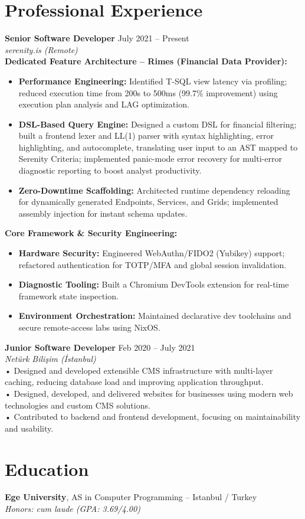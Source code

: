 \documentclass[11pt, a4paper]{article}
\begin{document}
\section*{Professional Experience}
\noindent
\textbf{Senior Software Developer} \hfill July 2021 -- Present \\
\textit{serenity.is (Remote)} \\[4pt]
    \noindent \textbf{Dedicated Feature Architecture – Rimes (Financial Data Provider):}
    \begin{itemize}[nosep]
        \item \textbf{Performance Engineering:} Identified T-SQL view latency via profiling; reduced execution time from 200s to 500ms (99.7\% improvement) using execution plan analysis and LAG optimization.
        \item \textbf{DSL-Based Query Engine:} Designed a custom DSL for financial filtering; built a frontend lexer and LL(1) parser with syntax highlighting, error highlighting, and autocomplete, translating user input to an AST mapped to Serenity Criteria; implemented panic-mode error recovery for multi-error diagnostic reporting to boost analyst productivity.
        \item \textbf{Zero-Downtime Scaffolding:} Architected runtime dependency reloading for dynamically generated Endpoints, Services, and Grids; implemented assembly injection for instant schema updates.
    \end{itemize}
    \noindent \textbf{Core Framework \& Security Engineering:}
    \begin{itemize}[nosep]
        \item \textbf{Hardware Security:} Engineered WebAuthn/FIDO2 (Yubikey) support; refactored authentication for TOTP/MFA and global session invalidation.
        \item \textbf{Diagnostic Tooling:} Built a Chromium DevTools extension for real-time framework state inspection.
        \item \textbf{Environment Orchestration:} Maintained declarative dev toolchains and secure remote-access labs using NixOS.
    \end{itemize}
\vspace{6pt}
\noindent \textbf{Junior Software Developer} \hfill Feb 2020 -- July 2021 \\
\textit{Netürk Bilişim (İstanbul)} \\[4pt]
• Designed and developed extensible CMS infrastructure with multi-layer caching, reducing database load and improving application throughput.\\
• Designed, developed, and delivered websites for businesses using modern web technologies and custom CMS solutions.\\
• Contributed to backend and frontend development, focusing on maintainability and usability.

\section*{Education}
\noindent\textbf{Ege University}, AS in Computer Programming – Istanbul / Turkey \\
\textit{Honors: cum laude (GPA: 3.69/4.00)}
\end{document}
